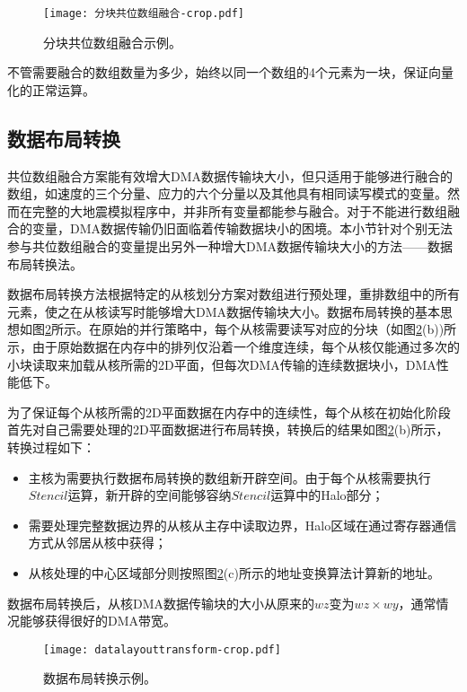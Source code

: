 \begin{figure}[ht]
\centering
\texttt{[image: 分块共位数组融合-crop.pdf]}
\caption{分块共位数组融合示例。}
\label{fig:block-fusion}
\end{figure}

不管需要融合的数组数量为多少，始终以同一个数组的4个元素为一块，保证向量化的正常运算。

\subsection{数据布局转换} %
\label{sub:数据布局转换}

共位数组融合方案能有效增大DMA数据传输块大小，但只适用于能够进行融合的数组，如速度的三个分量、应力的六个分量以及其他具有相同读写模式的变量。然而在完整的大地震模拟程序中，并非所有变量都能参与融合。对于不能进行数组融合的变量，DMA数据传输仍旧面临着传输数据块小的困境。本小节针对个别无法参与共位数组融合的变量提出另外一种增大DMA数据传输块大小的方法——数据布局转换法。

数据布局转换方法根据特定的从核划分方案对数组进行预处理，重排数组中的所有元素，使之在从核读写时能够增大DMA数据传输块大小。数据布局转换的基本思想如图\ref{fig:layout-trans}所示。在原始的并行策略中，每个从核需要读写对应的分块（如图\ref{fig:layout-trans}(b))所示，由于原始数据在内存中的排列仅沿着一个维度连续，每个从核仅能通过多次的小块读取来加载从核所需的2D平面，但每次DMA传输的连续数据块小，DMA性能低下。

为了保证每个从核所需的2D平面数据在内存中的连续性，每个从核在初始化阶段首先对自己需要处理的2D平面数据进行布局转换，转换后的结果如图\ref{fig:layout-trans}(b)所示，转换过程如下：

\begin{itemize}
  \item 主核为需要执行数据布局转换的数组新开辟空间。由于每个从核需要执行$Stencil$运算，新开辟的空间能够容纳$Stencil$运算中的Halo部分；
  \item 需要处理完整数据边界的从核从主存中读取边界，Halo区域在通过寄存器通信方式从邻居从核中获得；
  \item 从核处理的中心区域部分则按照图\ref{fig:layout-trans}(c)所示的地址变换算法计算新的地址。
\end{itemize}   

数据布局转换后，从核DMA数据传输块的大小从原来的$wz$变为$wz\times wy$，通常情况能够获得很好的DMA带宽。

\begin{figure}[ht]
\centering
\texttt{[image: datalayouttransform-crop.pdf]}
\caption{数据布局转换示例。}
\label{fig:layout-trans}
\end{figure}

